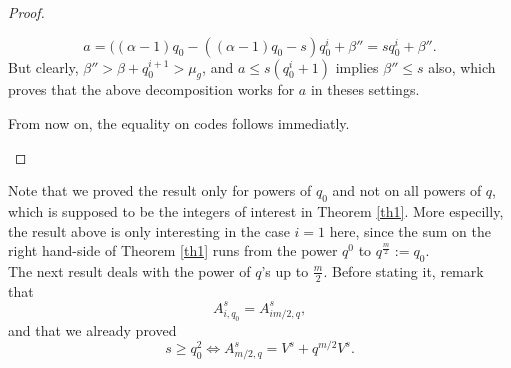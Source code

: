 \documentclass[a4paper]{article}
\newcommand{\calH}{\mathcal{H}}
\begin{document}
\begin{proof}
\begin{enumerate}
\begin{itemize}
\begin{itemize}
        \[ a = ((\alpha-1)q_0 - ((\alpha-1)q_0-s)q_0^i + \beta'' = sq_0^i + \beta''.\]
        But clearly, $\beta'' > \beta + q_0^{i+1} > \mu_g$, and $a \leq s(q_0^i+1)$ implies $\beta'' \leq s$ also, which proves that the above decomposition works for $a$ in theses settings.
    \end{itemize}
From now on, the equality on codes follows immediatly.
\end{itemize}
\end{enumerate}
\end{proof}


Note that we proved the result only for powers of $q_0$ and not on all powers of $q$, which is supposed to be the integers of interest in Theorem \ref{th1}. More especilly, the result above is only interesting in the case $i=1$ here, since the sum on the right hand-side of Theorem \ref{th1} runs from the power $q^0$ to $q^{\frac{m}{2} }:=q_0$. \\
The next result deals with the power of $q$'s up to $\frac{m}{2}$. Before stating it, remark that 
\[ A_{i,q_0}^s = A^s_{im/2,q},\]
and that we already proved
\[ s \geq q_0^2 \iff A^s_{m/2,q}=V^s+q^{m/2}V^s.\]
\end{document}
